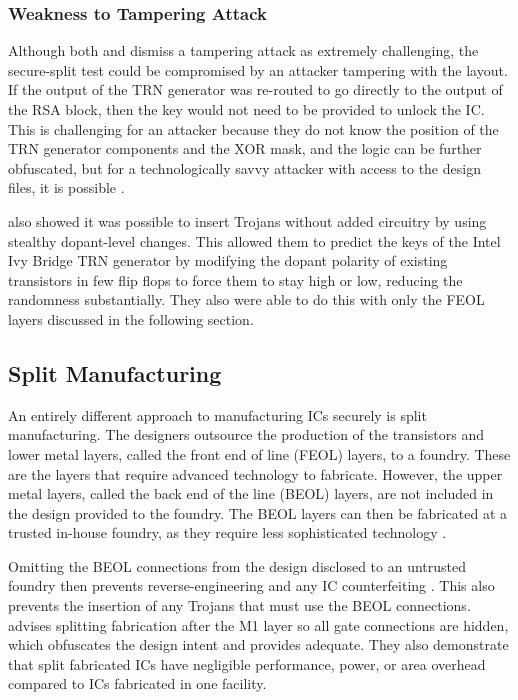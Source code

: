 \documentclass{IEEEtran}
\begin{document}
\subsubsection{Weakness to Tampering Attack}

Although both \cite{SST} and \cite{CSST} dismiss a tampering attack as extremely challenging, the secure-split test could be compromised by an attacker tampering with the layout. If the output of the TRN generator was re-routed to go directly to the output of the RSA block, then the key would not need to be provided to unlock the IC. This is challenging for an attacker because they do not know the position of the TRN generator components and the XOR mask, and the logic can be further obfuscated, but for a technologically savvy attacker with access to  the design files, it is possible \cite{SST}. 

\cite{becker2013stealthy} also showed it was possible to insert Trojans without added circuitry by using stealthy dopant-level changes. This allowed them to predict the keys of the Intel Ivy Bridge TRN generator by modifying the dopant polarity of existing transistors in few flip flops to force them to stay high or low, reducing the randomness substantially. They also were able to do this with only the FEOL layers discussed in the following section.

\subsection{Split Manufacturing}

An entirely different approach to manufacturing ICs securely is split manufacturing. The designers outsource the production of the transistors and lower metal layers, called the front end of line (FEOL) layers, to a foundry. These are the layers that require advanced technology to fabricate. However, the upper metal layers, called the back end of the line (BEOL) layers, are not included in the design provided to the foundry. The BEOL layers can then be fabricated at a trusted in-house foundry, as they require less sophisticated technology \cite{Split}. 

Omitting the BEOL connections from the design disclosed to an untrusted foundry  then prevents reverse-engineering and any IC counterfeiting \cite{Split}. This also prevents the insertion of any Trojans that must use the BEOL connections. \cite{Trusted} advises splitting fabrication after the M1 layer so all gate connections are hidden, which obfuscates the design intent and provides adequate. They also demonstrate that split fabricated ICs have negligible performance, power, or area overhead compared to ICs fabricated in one facility.
\end{document}
